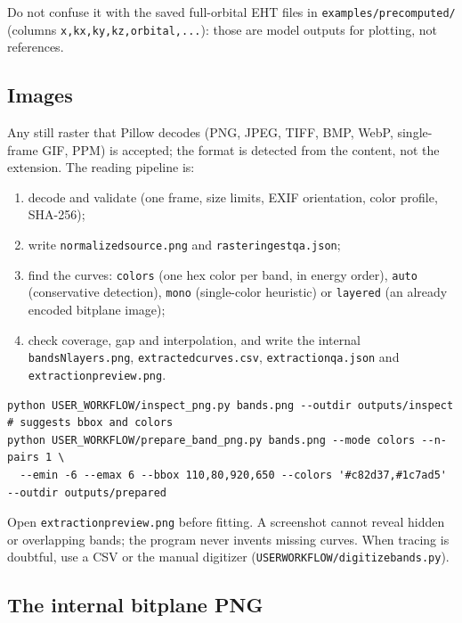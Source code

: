 \documentclass[11pt,a4paper]{article}
\newcommand{\cmd}[1]{\texttt{#1}}
\renewcommand{\_}{\origunderscore\allowbreak}
\begin{document}
Do not confuse it with the saved full-orbital EHT files in \cmd{examples/precomputed/} (columns
\cmd{x,kx,ky,kz,orbital\_1,...}): those are model outputs for plotting, not references.

\subsection{Images}

Any still raster that Pillow decodes (PNG, JPEG, TIFF, BMP, WebP, single-frame GIF, PPM) is accepted;
the format is detected from the content, not the extension. The reading pipeline is:

\begin{enumerate}[nosep]
  \item decode and validate (one frame, size limits, EXIF orientation, color profile, SHA-256);
  \item write \cmd{normalized\_source.png} and \cmd{raster\_ingest\_qa.json};
  \item find the curves: \cmd{colors} (one hex color per band, in energy order), \cmd{auto}
        (conservative detection), \cmd{mono} (single-color heuristic) or \cmd{layered} (an already
        encoded bitplane image);
  \item check coverage, gap and interpolation, and write the internal \cmd{bands\_N\_layers.png},
        \cmd{extracted\_curves.csv}, \cmd{extraction\_qa.json} and \cmd{extraction\_preview.png}.
\end{enumerate}

\begin{lstlisting}[style=sh]
python USER_WORKFLOW/inspect_png.py bands.png --outdir outputs/inspect     # suggests bbox and colors
python USER_WORKFLOW/prepare_band_png.py bands.png --mode colors --n-pairs 1 \
  --emin -6 --emax 6 --bbox 110,80,920,650 --colors '#c82d37,#1c7ad5' --outdir outputs/prepared
\end{lstlisting}

\begin{aviso}
Open \cmd{extraction\_preview.png} before fitting. A screenshot cannot reveal hidden or overlapping
bands; the program never invents missing curves. When tracing is doubtful, use a CSV or the manual
digitizer (\cmd{USER\_WORKFLOW/digitize\_bands.py}).
\end{aviso}

\subsection{The internal bitplane PNG}
\end{document}
